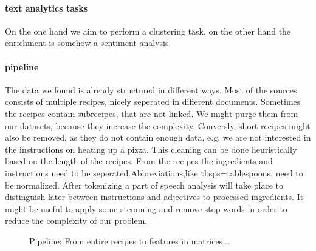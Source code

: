 \documentclass[
     12pt,         %
     a4paper,      %
     BCOR10mm,     %
     DIV14,        %
     ]{article}
\begin{document}
\paragraph{text analytics tasks} On the one hand we aim to perform a clustering task, on the other hand the enrichment  is somehow a sentiment analysis. %

\paragraph{pipeline} The data we found is already structured in different ways. Most of the sources consists of multiple recipes, nicely seperated in different documents.
Sometimes the recipes contain subrecipes, that are not linked. We might purge them from our datasets, because they increase the complexity. Conversly, short recipes 
might also be removed, as they do not contain enough data, e.g. we are not interested in the instructions on heating up a pizza.
This cleaning can be done heuristically based on the length of the recipes. From the recipes the ingredients and instructions need to be seperated.Abbreviations,like tbsps=tablespoons,
need to be normalized.
After tokenizing a part of speech analysis will take place to distinguish later between instructions and adjectives to processed ingredients.
It might  be useful to apply some stemming and remove stop words in order to reduce the complexity of our problem. 


\begin{figure}[b!]
  \centering

  \caption{Pipeline: From entire recipes to features in matrices...}
  \label{fig:pipeline}
\end{figure}
\end{document}
